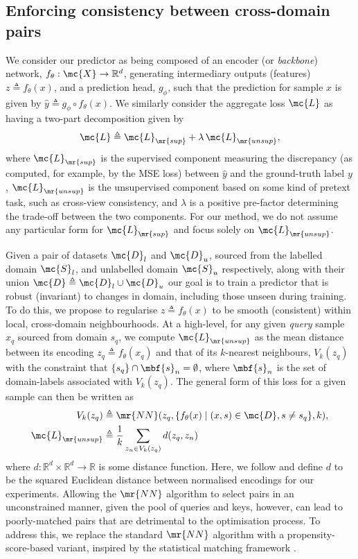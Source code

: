 \subsection{Enforcing consistency between cross-domain pairs}

We consider our predictor as being composed of an encoder (or \emph{backbone}) network,
$f_\theta:
\mc{X} \rightarrow \mathbb{R}^d$, generating intermediary outputs (features) $z \triangleq
f_\theta(x)$, and a prediction head, $g_\phi$, such that the prediction for sample $x$ is given by
$\hat{y} \triangleq g_\phi \circ f_\theta(x)$.
%
We similarly consider the aggregate loss $\mc{L}$ as having a two-part decomposition given by
%
\begin{equation}
    \mc{L} \triangleq \mc{L}_{\mr{sup}} + \lambda \, \mc{L}_{\mr{unsup}},
\end{equation}
%
where $\mc{L}_\mr{sup}$ is the supervised component measuring the discrepancy (as computed, for
example, by the MSE loss) between $\hat{y}$ and the ground-truth label $y$, $\mc{L}_{\mr{unsup}}$
is the unsupervised component based on some kind of pretext task, such as cross-view consistency,
and $\lambda$ is a positive pre-factor determining the trade-off between the two components.
%
For our method, we do not assume any particular form for  $\mc{L}_{\mr{sup}}$ and focus solely on
$\mc{L}_\mr{unsup}$.
%

Given a pair of datasets $\mc{D}_l$ and  $\mc{D}_u$, sourced from the labelled domain $\mc{S}_l$,
and unlabelled domain $\mc{S}_u$ respectively, along with their union $\mc{D} \triangleq \mc{D}_l
\cup \mc{D}_u$ our goal is to train a predictor that is robust (invariant) to changes in domain,
including those unseen during training.
%
To do this, we propose to regularise $z \triangleq f_\theta(x)$ to be smooth (consistent) within
local, cross-domain neighbourhoods.
%
At a high-level, for any given \emph{query} sample $x_q$ sourced from domain $s_q$, we compute
$\mc{L}_{\mr{unsup}}$ as the mean distance between its encoding $z_q \triangleq f_\theta(x_q)$ and
that of its $k$-nearest neighbours, $V_k(z_q)$ with the constraint that $\{ s_q \} \cap \mbf{s}_n =
\emptyset$, where $\mbf{s}_n$ is the set of domain-labels associated with $V_k(z_q)$.
%
The general form of this loss for a given sample can then be written as
\begin{align}
    V_k(z_q) &\triangleq \mr{NN}(z_q, \{ f_\theta(x)\;|\; (x, s) \in \mc{D}, s \neq s_q \}, k),
    \label{cgnn} \\
    \mc{L}_{\mr{unsup}} &\triangleq \frac{1}{k} \sum_{z_n \in V_k(z_q)} d(z_q, z_n)
\end{align}
%
where $d: \mathbb{R}^d \times \mathbb{R}^d \rightarrow \mathbb{R}$ is some distance function.
%
Here, we follow \cite{grill2020bootstrap} and define $d$ to be the squared Euclidean distance
between normalised encodings for our experiments.
%
Allowing the $\mr{NN}$ algorithm to select pairs in an unconstrained manner, given the pool of
queries and keys, however, can lead to poorly-matched pairs that are detrimental to the
optimisation process.
%
To address this, we replace the standard $\mr{NN}$ algorithm with a propensity-score-based variant,
inspired by the statistical matching framework \citep{rosenbaum1983central}.

